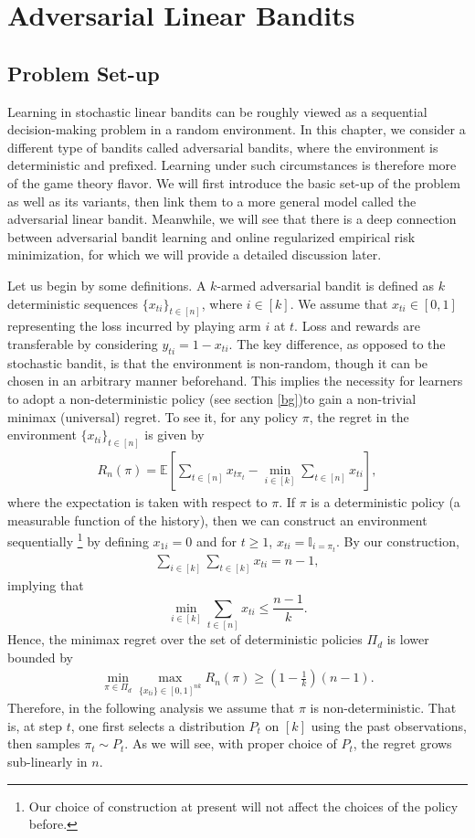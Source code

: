 \documentclass[letterpaper,11pt,openright,openany]{book}
\numberwithin{equation}{section}
\theoremstyle{plain}
\theoremstyle{definition}
\def\E{{\mathbb E}}
\begin{document}
\chapter{Adversarial Linear Bandits}

\section{Problem Set-up}
Learning in stochastic linear bandits can be roughly viewed as a sequential decision-making problem in a random environment. 
In this chapter, we consider a different type of bandits called adversarial bandits, where the environment is deterministic and prefixed.
Learning under such circumstances is therefore more of the game theory flavor.  
We will first introduce the basic set-up of the problem as well as its variants, then link them to a more general model called the adversarial linear bandit. 
Meanwhile, we will see that there is a deep connection between adversarial bandit learning and online regularized empirical risk minimization, for which we will provide a detailed discussion later.  

Let us begin by some definitions. A $k$-armed adversarial bandit is defined as $k$ deterministic sequences $\{x_{ti}\}_{t\in [n]}$, where $i\in [k]$. 
We assume that $x_{ti}\in [0,1]$ representing the loss incurred by playing arm $i$ at $t$. 
Loss and rewards are transferable by considering $y_{ti} =1-x_{ti}$. 
The key difference, as opposed to the stochastic bandit, is that the environment is non-random, though it can be chosen in an arbitrary manner beforehand. 
This implies the necessity for learners to adopt a non-deterministic policy (see section \ref{bg})to gain a non-trivial minimax (universal) regret. To see it, for any policy $\pi$, the regret in the environment $\{x_{ti}\}_{t\in [n]}$ is given by
\begin{align}
R_n(\pi) = \E\left[\sum_{t\in [n]}x_{t\pi_t}-\min_{i\in [k]}\sum_{t\in [n]}x_{ti}\right],\label{al:reg}
\end{align}
where the expectation is taken with respect to $\pi$. If $\pi$ is a deterministic policy (a measurable function of the history), then we can construct an environment sequentially \footnote{Our choice of construction at present will not affect the choices of the policy before.} 
by defining $x_{1i}=0$ and for $t\geq 1$, $x_{ti}=\mathbb I_{i=\pi_t}$. By our construction,
\begin{align*}
\sum_{i\in [k]}\sum_{t\in [k]}x_{ti} = n-1,
\end{align*}
implying that $$\min_{i\in [k]}\sum_{t\in [n]}x_{ti}\leq\frac{n-1}{k}.$$ 
Hence, the minimax regret over the set of deterministic policies $\Pi_d$ is lower bounded by 
\begin{align}
\min_{\pi\in\Pi_d}\max_{\{x_{ti}\}\in [0,1]^{nk}}R_n(\pi)\geq \left(1-\frac{1}{k}\right)(n-1).\label{al:ct}
\end{align}
Therefore, in the following analysis we assume that $\pi$ is non-deterministic. That is, at step $t$, one first selects a distribution $P_t$ on $[k]$ using the past observations, then samples $\pi_t\sim P_t$. As we will see, with proper choice of $P_t$, the regret grows sub-linearly in $n$.  
\end{document}
